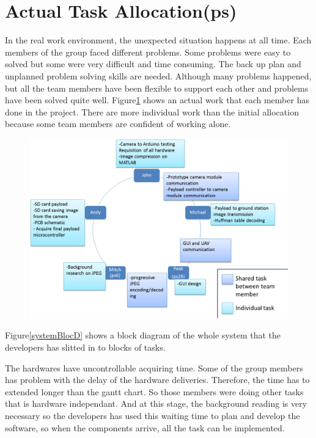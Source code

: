 \section{Actual Task Allocation(ps)}
In the real work environment, the unexpected situation happens at all time. 
Each members of the group faced different problems.
Some problems were easy to solved but some were very difficult and time consuming. 
The back up plan and unplanned problem solving skills are needed. 
Although many problems happened, but all the team members have been flexible to support each other and problems have been solved quite well. Figure\ref{final task allocation} shows an actual work that each member has done in the project. There are more individual work than the initial allocation because some team members are confident of working alone.

\begin{figure}[H]
        \centering
\includegraphics[width=1.0\textwidth]{figures/finalWorkAllocation.png} 
        \label{final task allocation}
\end{figure}

Figure\ref{systemBlocD} shows a block diagram of the whole system that the developers has slitted in to blocks of tasks. 

The hardwares have uncontrollable acquiring time. 
Some of the group members has problem with the delay of the hardware deliveries. Therefore, the time has to extended longer than the gantt chart. 
So those members were doing other tasks that is hardware independant. 
And at this stage, the background reading is very necessary so the developers has used this waiting time to plan and develop the software, so when the components arrive, all the task can be implemented.

